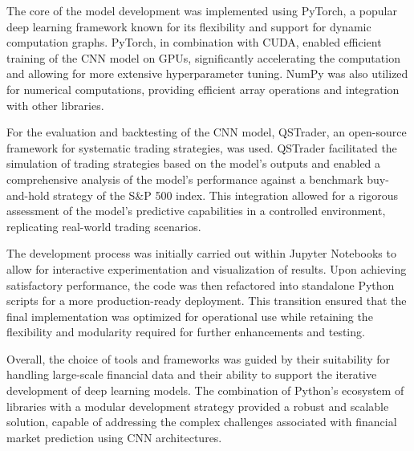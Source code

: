 The core of the model development was implemented using PyTorch, a popular deep learning framework known for its flexibility and support for dynamic computation graphs. PyTorch, in combination with CUDA, enabled efficient training of the CNN model on GPUs, significantly accelerating the computation and allowing for more extensive hyperparameter tuning. NumPy was also utilized for numerical computations, providing efficient array operations and integration with other libraries.

For the evaluation and backtesting of the CNN model, QSTrader, an open-source framework for systematic trading strategies, was used. QSTrader facilitated the simulation of trading strategies based on the model's outputs and enabled a comprehensive analysis of the model's performance against a benchmark buy-and-hold strategy of the S\&P 500 index. This integration allowed for a rigorous assessment of the model's predictive capabilities in a controlled environment, replicating real-world trading scenarios.

The development process was initially carried out within Jupyter Notebooks to allow for interactive experimentation and visualization of results. Upon achieving satisfactory performance, the code was then refactored into standalone Python scripts for a more production-ready deployment. This transition ensured that the final implementation was optimized for operational use while retaining the flexibility and modularity required for further enhancements and testing.

Overall, the choice of tools and frameworks was guided by their suitability for handling large-scale financial data and their ability to support the iterative development of deep learning models. The combination of Python's ecosystem of libraries with a modular development strategy provided a robust and scalable solution, capable of addressing the complex challenges associated with financial market prediction using CNN architectures.